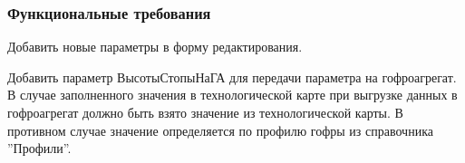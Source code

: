 
   




\subsubsection{Функциональные требования}


Добавить новые параметры в форму редактирования.

 

\bigskip



Добавить параметр ВысотыСтопыНаГА для передачи параметра на гофроагрегат.
В случае заполненного значения в технологической карте при выгрузке данных в гофроагрегат должно быть взято значение из технологической карты.
В противном случае значение определяется по профилю гофры из справочника ''Профили''. 



